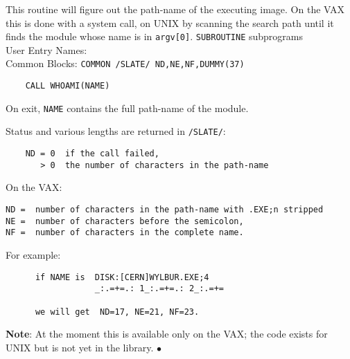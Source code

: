                            
             
\Submitter{}                                 
                       \Revised{}
This routine will figure out the path-name of the executing image.
On the VAX this is done with a system call, on UNIX by scanning the
search path until it finds the module whose name is in {\tt argv[0]}.
\Structure
{\tt SUBROUTINE} subprograms \\
User Entry Names:  \\
Common Blocks: {\tt COMMON /SLATE/ ND,NE,NF,DUMMY(37)}
\Usage
\begin{verbatim}
    CALL WHOAMI(NAME)
\end{verbatim}
On exit, {\tt NAME} contains the full path-name of the module.
 
Status and various lengths are returned in {\tt /SLATE/}:
\begin{verbatim}
    ND = 0  if the call failed,
       > 0  the number of characters in the path-name
\end{verbatim}
On the VAX:
\begin{verbatim}
ND =  number of characters in the path-name with .EXE;n stripped
NE =  number of characters before the semicolon,
NF =  number of characters in the complete name.
\end{verbatim}
For example:
\begin{verbatim}
      if NAME is  DISK:[CERN]WYLBUR.EXE;4
                  _:.=+=.: 1_:.=+=.: 2_:.=+=
 
      we will get  ND=17, NE=21, NF=23.
\end{verbatim}
{\bf Note}: At the moment this is available only on the VAX; the code
exists for UNIX but is not yet in the library.
$\bullet$
